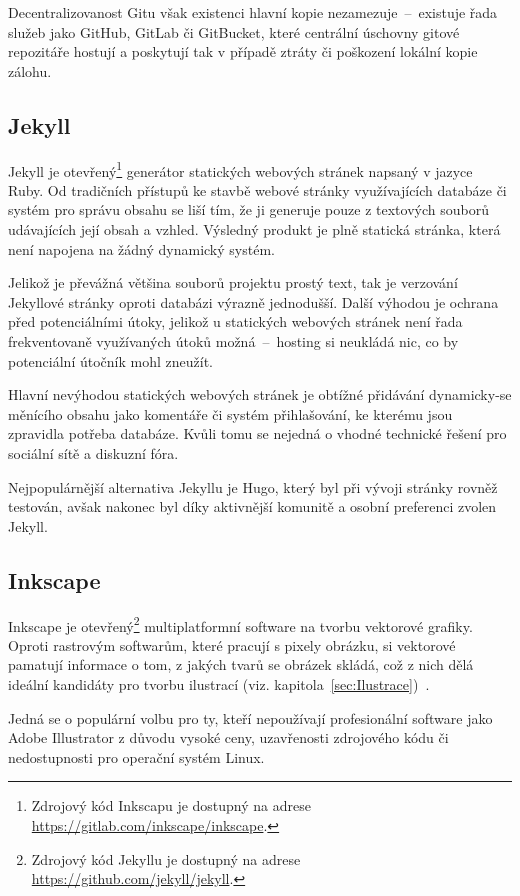 \documentclass[a4paper, 12pt, twoside]{article}
\begin{document}
  Decentralizovanost Gitu však existenci hlavní kopie nezamezuje~--~existuje řada služeb jako GitHub, GitLab či GitBucket, které centrální úschovny gitové repozitáře hostují a poskytují tak v případě ztráty či poškození lokální kopie zálohu.


  \subsection{Jekyll} \label{sec:Jekyll}
  Jekyll je otevřený\footnote{Zdrojový kód Inkscapu je dostupný na adrese \url{https://gitlab.com/inkscape/inkscape}.} generátor statických webových stránek napsaný v jazyce Ruby. Od tradičních přístupů ke stavbě webové stránky využívajících databáze či systém pro správu obsahu se liší tím, že ji generuje pouze z textových souborů udávajících její obsah a vzhled. Výsledný produkt je plně statická stránka, která není napojena na žádný dynamický systém.

  Jelikož je převážná většina souborů projektu prostý text, tak je verzování Jekyllové stránky oproti databázi výrazně jednodušší. Další výhodou je ochrana před potenciálními útoky, jelikož u statických webových stránek není řada frekventovaně využívaných útoků možná~--~hosting si neukládá nic, co by potenciální útočník mohl zneužít.

  Hlavní nevýhodou statických webových stránek je obtížné přidávání dynamicky-se měnícího obsahu jako komentáře či systém přihlašování, ke kterému jsou zpravidla potřeba databáze. Kvůli tomu se nejedná o vhodné technické řešení pro sociální sítě a diskuzní fóra.

  Nejpopulárnější alternativa Jekyllu je Hugo, který byl při vývoji stránky rovněž testován, avšak nakonec byl díky aktivnější komunitě a osobní preferenci zvolen Jekyll.


  \subsection{Inkscape} \label{sec:Inkscape}
  Inkscape je otevřený\footnote{Zdrojový kód Jekyllu je dostupný na adrese \url{https://github.com/jekyll/jekyll}.} multiplatformní software na tvorbu vektorové grafiky. Oproti rastrovým softwarům, které pracují s pixely obrázku, si vektorové pamatují informace o tom, z jakých tvarů se obrázek skládá, což z nich dělá ideální kandidáty pro tvorbu ilustrací (viz. kapitola~\ref{sec:Ilustrace})~\cite{vector-vs-bitmap}.

  Jedná se o populární volbu pro ty, kteří nepoužívají profesionální software jako Adobe Illustrator z důvodu vysoké ceny, uzavřenosti zdrojového kódu či nedostupnosti pro operační systém Linux.
\end{document}
